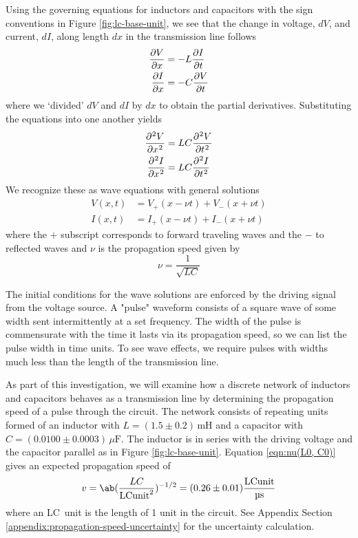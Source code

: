 \documentclass[
	a4paper, %
	10pt, %
	twoside, %
]{journal}
\begin{document}
Using the governing equations for inductors and capacitors with the sign conventions in Figure \ref{fig:lc-base-unit}, we see that the change in voltage, $dV$, and current, $dI$, along length $dx$ in the transmission line follows
\begin{align}
    \label{eqn:dV_dx-telegraphers}
    \diffp{V}{x} &= -L\diffp{I}{t} \\ 
    \label{eqn:dI_dx-telegraphers}
    \diffp{I}{x} &= -C \diffp{V}{t}
\end{align}
where we `divided' $dV$ and $dI$ by $dx$ to obtain the partial derivatives. Substituting the equations into one another yields 
\begin{align}
    \label{eqn:V_wave_equation}
    \diffp[2]{V}{x} &= LC \diffp[2]{V}{t} \\ 
    \label{eqn:I_wave_equation}
    \diffp[2]{I}{x} &= LC \diffp[2]{I}{t} 
\end{align}
We recognize these as wave equations with general solutions
\begin{align}
    \label{eqn:v(x,t)-wave-solution}
    V(x,t) &= V_+(x - \nu t) + V_-(x + \nu t)\\ 
    \label{eqn:i(x,t)-wave-solution}
    I(x,t) &= I_+(x - \nu t) + I_-(x + \nu t)
\end{align}
where the $+$ subscript corresponds to forward traveling waves and the $-$ to reflected waves and $\nu$ is the propagation speed given by
\begin{equation}
    \label{eqn:nu(L0, C0)}
    \nu = \frac1{\sqrt{LC}}
\end{equation}

The initial conditions for the wave solutions are enforced by the driving signal from the voltage source. A "pulse" waveform consists of a square wave of some width sent intermittently at a set frequency. The width of the pulse is commensurate with the time it lasts via its propagation speed, so we can list the pulse width in time units. To see wave effects, we require pulses with widths much less than the length of the transmission line. 

As part of this investigation, we will examine how a discrete network of inductors and capacitors behaves as a transmission line by determining the propagation speed of a pulse through the circuit. The network consists of repeating units formed of an inductor with $L = (1.5 \pm 0.2)\,\mathrm{mH}$ and a capacitor with $C = (0.0100 \pm 0.0003)\,\mu\mathrm{F}$. The inductor is in series with the driving voltage and the capacitor parallel as in Figure \ref{fig:lc-base-unit}. Equation \ref{eqn:nu(L0, C0)} gives an expected propagation speed of 
\begin{equation}
    \label{eqn:nu(discrete-theoretical)}
    v = \ab(\frac{LC}{\unit{LCunit^2}})^{-1/2}\\ 
    = (0.26 \pm 0.01)\unit{\frac{LC unit}{ \micro s}}
\end{equation}
where an \unit{LC unit} is the length of 1 unit in the circuit. See Appendix Section \ref{appendix:propagation-speed-uncertainty} for the uncertainty calculation.
\end{document}

